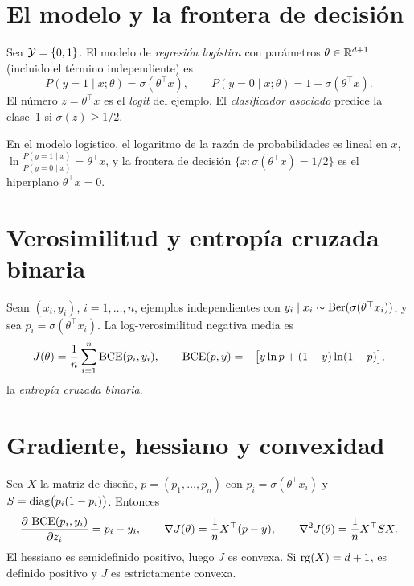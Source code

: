 \section{El modelo y la frontera de decisión}

\begin{definicion}\label{def:logistica}
Sea $\mathcal{Y}=\{0,1\}$. El modelo de \emph{regresión logística} con parámetros $\theta\in\mathbb{R}^{d+1}$ (incluido el término independiente) es
\[
P(y=1\mid x;\theta)=\sigma(\theta^{\top}x),\qquad P(y=0\mid x;\theta)=1-\sigma(\theta^{\top}x).
\]
El número $z=\theta^{\top}x$ es el \emph{logit} del ejemplo. El \emph{clasificador asociado} predice la clase~1 si $\sigma(z)\ge 1/2$.
\end{definicion}

\begin{proposicion}\label{prop:frontera}
En el modelo logístico, el logaritmo de la razón de probabilidades es lineal en $x$, $\ln\frac{P(y=1\mid x)}{P(y=0\mid x)}=\theta^{\top}x$, y la frontera de decisión $\{x:\sigma(\theta^{\top}x)=1/2\}$ es el hiperplano $\theta^{\top}x=0$.
\end{proposicion}

\section{Verosimilitud y entropía cruzada binaria}

\begin{proposicion}\label{prop:bce}
Sean $(x_i,y_i)$, $i=1,\dots,n$, ejemplos independientes con $y_i\mid x_i\sim\operatorname{Ber}(\sigma(\theta^{\top}x_i))$, y sea $p_i=\sigma(\theta^{\top}x_i)$. La log-verosimilitud negativa media es
\[
J(\theta)=\frac{1}{n}\sum_{i=1}^{n}\operatorname{BCE}(p_i,y_i),\qquad \operatorname{BCE}(p,y)=-\bigl[y\ln p+(1-y)\ln(1-p)\bigr],
\]
la \emph{entropía cruzada binaria}.
\end{proposicion}

\addtocounter{definicion}{1}%

\section{Gradiente, hessiano y convexidad}

\begin{teorema}\label{teo:grad-logistica}
Sea $X$ la matriz de diseño, $p=(p_1,\dots,p_n)$ con $p_i=\sigma(\theta^{\top}x_i)$ y $S=\operatorname{diag}\bigl(p_i(1-p_i)\bigr)$. Entonces
\[
\frac{\partial\,\operatorname{BCE}(p_i,y_i)}{\partial z_i}=p_i-y_i,\qquad
\nabla J(\theta)=\frac{1}{n}X^{\top}(p-y),\qquad
\nabla^{2}J(\theta)=\frac{1}{n}X^{\top}SX.
\]
El hessiano es semidefinido positivo, luego $J$ es convexa. Si $\operatorname{rg}(X)=d+1$, es definido positivo y $J$ es estrictamente convexa.
\end{teorema}

